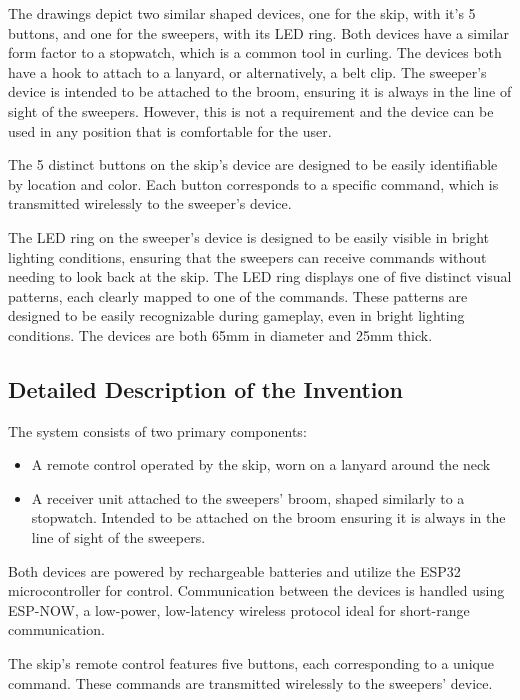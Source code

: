 \documentclass{article}
\begin{document}
The drawings depict two similar shaped devices, one for the skip, with it's 5 buttons, and one for the sweepers, with its LED ring. Both devices have a similar form factor to a stopwatch, which is a common tool in curling. The devices both have a hook to attach to a lanyard, or alternatively, a belt clip. The sweeper's device is intended to be attached to the broom, ensuring it is always in the line of sight of the sweepers. However, this is not a requirement and the device can be used in any position that is comfortable for the user.

The 5 distinct buttons on the skip's device are designed to be easily identifiable by location and color. Each button corresponds to a specific command, which is transmitted wirelessly to the sweeper's device.

The LED ring on the sweeper's device is designed to be easily visible in bright lighting conditions, ensuring that the sweepers can receive commands without needing to look back at the skip. The LED ring displays one of five distinct visual patterns, each clearly mapped to one of the commands. These patterns are designed to be easily recognizable during gameplay, even in bright lighting conditions. The devices are both 65mm in diameter and 25mm thick.

\subsection{Detailed Description of the Invention}

The system consists of two primary components:
\begin{itemize}
    \item A remote control operated by the skip, worn on a lanyard around the neck
    \item A receiver unit attached to the sweepers' broom, shaped similarly to a stopwatch. Intended to be attached on the broom ensuring it is always in the line of sight of the sweepers.
\end{itemize}

Both devices are powered by rechargeable batteries and utilize the ESP32 microcontroller for control. Communication between the devices is handled using ESP-NOW, a low-power, low-latency wireless protocol ideal for short-range communication.

The skip's remote control features five buttons, each corresponding to a unique command. These commands are transmitted wirelessly to the sweepers' device.
\end{document}
